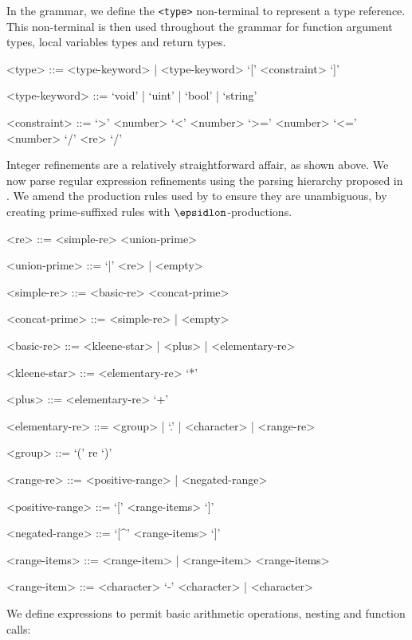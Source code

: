 \documentclass[a4paper,openany,12pt]{book}
\begin{document}
In the grammar, we define the \texttt{<type>} non-terminal to represent a type reference.
This non-terminal is then used throughout the grammar for function argument types, local variables types and return
types.

\begin{grammar}
    <type> ::= <type-keyword> | <type-keyword> `[' <constraint> `]'

    <type-keyword> ::= `void' | `uint' | `bool' | `string'

    <constraint> ::= `>' <number> \alt `<' <number> \alt `>=' <number> \alt `<=' <number> \alt `/' <re> `/'
\end{grammar}

Integer refinements are a relatively straightforward affair, as shown above.
We now parse regular expression refinements using the parsing hierarchy proposed in \citet{cameron1999}.
We amend the production rules used by \citeauthor{cameron1999} to ensure they are unambiguous, by creating
prime-suffixed rules with $\epsidlon$-productions.

\begin{grammar}

    <re> ::= <simple-re> <union-prime>

    <union-prime> ::= `|' <re> | <empty>

    <simple-re> ::= <basic-re> <concat-prime>

    <concat-prime> ::= <simple-re> | <empty>

    <basic-re> ::= <kleene-star> | <plus> | <elementary-re>

    <kleene-star> ::= <elementary-re> `*'

    <plus> ::= <elementary-re> `+'

    <elementary-re> ::= <group> | `.' | <character> | <range-re>

    <group> ::= `(' re `)'

    <range-re> ::= <positive-range> | <negated-range>

    <positive-range> ::= `[' <range-items> `]'

    <negated-range> ::= `[^' <range-items> `]'

    <range-items> ::= <range-item> | <range-item> <range-items>

    <range-item> ::= <character> `-' <character> | <character>

\end{grammar}

We define expressions to permit basic arithmetic operations, nesting and function calls:
\end{document}
